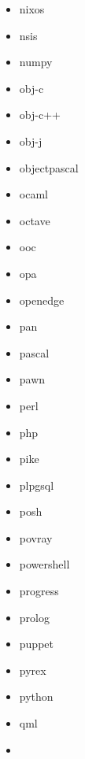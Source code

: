 \documentclass[conference,10pt]{IEEEtran}
\begin{document}
\begin{multicols}{4}
\begin{itemize}[label={},leftmargin=*]
\item nixos
\item nsis
\item numpy
\item obj-c
\item obj-c++
\item obj-j
\item objectpascal
\item ocaml
\item octave
\item ooc
\item opa
\item openedge
\item pan
\item pascal
\item pawn
\item perl
\item php
\item pike
\item plpgsql
\item posh
\item povray
\item powershell
\item progress
\item prolog
\item puppet
\item pyrex
\item python
\item qml
\item {}
\end{itemize}
\end{multicols}
\end{document}
